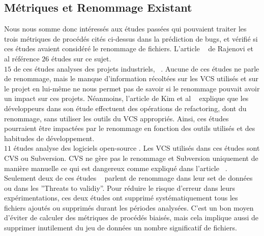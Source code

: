 \subsection{Métriques et Renommage Existant}
Nous nous somme donc intéressés aux études passées qui pouvaient traiter les trois métriques de procédés cités ci-dessus dans la prédiction de bugs, et vérifié si ces études avaient considéré le renommage de fichiers. L'article ~\cite{radjenovic_software_2013} de Rajenovi et al référence $26$ études sur ce sujet.\\

$15$ de ces études analyses des projets industriels, ~\cite{arisholm_systematic_2010,graves_predicting_2000,khoshgoftaar_using_2000,layman_iterative_2008,munson_code_1998,nagappan_use_2005,nagappan_influence_2008,nagappan_using_2007,nagappan_using_2006,nagappan_change_2010,nikora_building_2006,ostrand_programmer-based_2010,weyuker_too_2008,weyuker_using_2007,yuan_application_2000}. Aucune de ces études ne parle de renommage, mais le manque d'information récoltées sur les VCS utilisés et sur le projet en lui-même ne nous permet pas de savoir si le renommage pouvait avoir un impact sur ces projets. Néanmoins, l'article de Kim et al ~\cite{kim_field_2012} explique que les développeurs dans son étude effectuent des opérations de refactoring, dont du renommage, sans utiliser les outils du VCS appropriés. Ainsi, ces études pourraient être impactées par le renommage en fonction des outils utilisés et des habitudes de développement.\\

$11$ études analyse des logiciels open-source \cite{dambros_relationship_2009,bacchelli_are_2010,caglayan_merits_2009,dambros_evaluating_2012,dambros_evaluating_2012,dambros_extensive_2010,illes-seifert_exploring_2010,li_finding_2005,matsumoto_analysis_2010,moser_analysis_2008,moser_comparative_2008,schroter_if_2006}. Les VCS utilisés dans ces études sont CVS ou Subversion. CVS ne gère pas le renommage et Subversion uniquement de manière manuelle ce qui est dangereux comme expliqué dans l'article ~\cite{lavoie_inferring_2012,steidl_incremental_2014}. Seulement deux de ces études ~\cite{moser_analysis_2008,moser_comparative_2008} parlent de renommage dans leur set de données ou dans les ''Threats to validiy''. Pour réduire le risque d'erreur dans leurs expérimentations, ces deux études ont supprimé systématiquement tous les fichiers ajoutés ou supprimés durant les périodes analysées. C'est un bon moyen d'éviter de calculer des métriques de procédés biaisés, mais cela implique aussi de supprimer inutilement du jeu de données un nombre significatif de fichiers.\\

